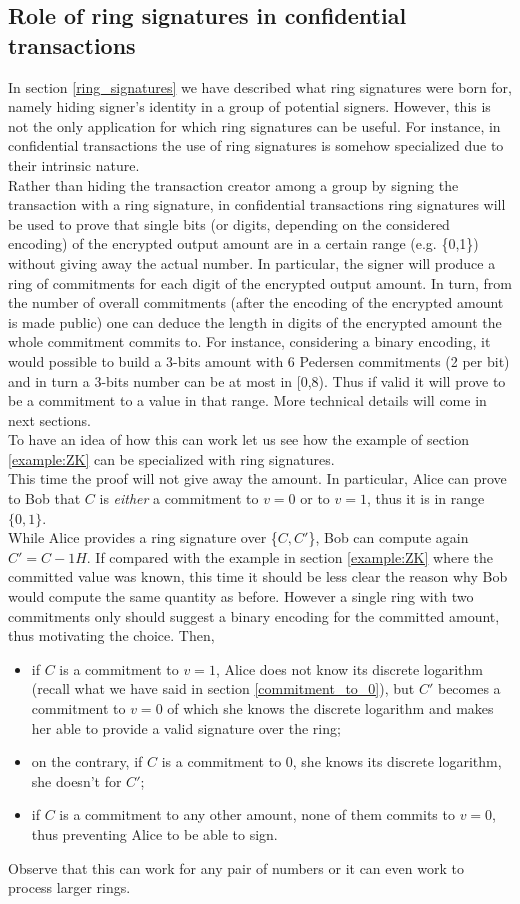 \subsection{Role of ring signatures in confidential transactions}
\label{role_ring_sign_in_CT}
In section \ref{ring_signatures} we have described what ring signatures were born for, namely hiding signer's identity in a group of potential signers. However, this is not the only application for which ring signatures can be useful. For instance, in confidential transactions the use of ring signatures is somehow specialized due to their intrinsic nature.\\
Rather than hiding the transaction creator among a group by signing the transaction with a ring signature, in confidential transactions ring signatures will be used to prove that single bits (or digits, depending on the considered encoding) of the encrypted output amount are in a certain range (e.g. \{0,1\}) without giving away the actual number. In particular, the signer will produce a ring of commitments for each digit of the encrypted output amount. In turn, from the number of overall commitments (after the encoding of the encrypted amount is made public) one can deduce the length in digits of the encrypted amount the whole commitment commits to. For instance, considering a binary encoding, it would possible to build a 3-bits amount with 6 Pedersen commitments (2 per bit) and in turn a 3-bits number can be at most in [0,8). Thus if valid it will prove to be a commitment to a value in that range. More technical details will come in next sections.\\
To have an idea of how this can work let us see how the example of section \ref{example:ZK} can be specialized with ring signatures.\\
This time the proof will not give away the amount. In particular, Alice can prove to Bob that $C$ is \textit{either} a commitment to $v=0$ or to $v=1$, thus it is in range $\{0,1\}$.\\
While Alice provides a ring signature over \{$C, C'$\}, Bob can compute again $C' = C - 1H$. If compared with the example in section \ref{example:ZK} where the committed value was known, this time it should be less clear the reason why Bob would compute the same quantity as before. However a single ring with two commitments only should suggest a binary encoding for the committed amount, thus motivating the choice. Then,
\begin{itemize}
    \item if $C$ is a commitment to $v=1$, Alice does not know its discrete logarithm (recall what we have said in section \ref{commitment_to_0}), but $C'$ becomes a commitment to $v=0$ of which she knows the discrete logarithm and makes her able to provide a valid signature over the ring;
    \item on the contrary, if $C$ is a commitment to 0, she knows its discrete logarithm, she doesn’t for $C'$;
    \item if $C$ is a commitment to any other amount, none of them commits to $v=0$, thus preventing Alice to be able to sign.
\end{itemize}
Observe that this can work for any pair of numbers or it can even work to process larger rings.

